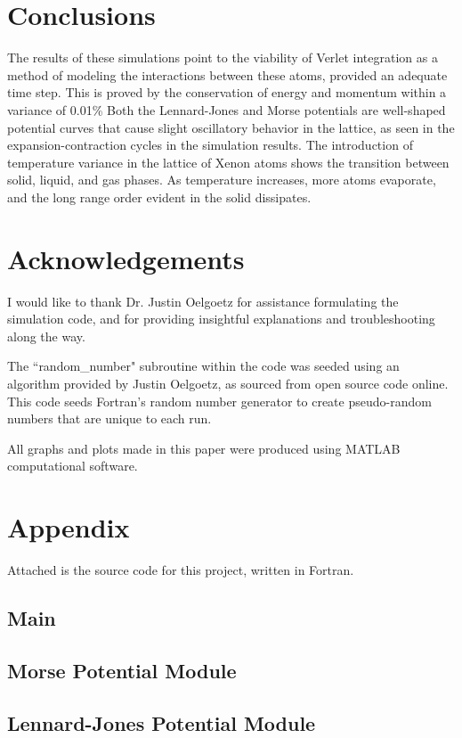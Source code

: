 \documentclass[12pt]{article}
\begin{document}
\section*{Conclusions}
The results of these simulations point to the viability of Verlet integration as a method of modeling the interactions between these atoms, provided an adequate time step.  This is proved by the conservation of energy and momentum within a variance of 0.01\%   Both the Lennard-Jones and Morse potentials are well-shaped potential curves that cause slight oscillatory behavior in the lattice, as seen in the expansion-contraction cycles in the simulation results. \cite{mpotential,ljpotential} The introduction of temperature variance in the lattice of Xenon atoms shows the transition between solid, liquid, and gas phases.  As temperature increases, more atoms evaporate, and the long range order evident in the solid dissipates.

\pagebreak
\section*{Acknowledgements}
I would like to thank Dr. Justin Oelgoetz for assistance formulating the simulation code, and for providing insightful explanations and troubleshooting along the way.

The ``random\_number" subroutine within the code was seeded using an algorithm provided by Justin Oelgoetz, as sourced from open source code online.  This code seeds Fortran's random number generator to create pseudo-random numbers that are unique to each run.

All graphs and plots made in this paper were produced using MATLAB computational software.
\newpage


\newpage
\section*{Appendix}
Attached is the source code for this project, written in Fortran.
\subsection*{Main}

\subsection*{Morse Potential Module}

\subsection*{Lennard-Jones Potential Module}

\end{document}
